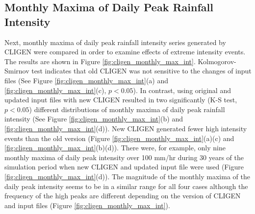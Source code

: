 \subsection{Monthly Maxima of Daily Peak Rainfall Intensity}
Next, monthly maxima of daily peak rainfall intensity series generated by CLIGEN
were compared in order to examine effects of extreme intensity events. The
results are shown in Figure \ref{fig:cligen_monthly_max_int}.
Kolmogorov-Smirnov test indicates that old CLIGEN was not sensitive to the
changes of input files (See Figure \ref{fig:cligen_monthly_max_int}(a) and
\ref{fig:cligen_monthly_max_int}(c), $p<0.05$). In contrast, using original and
updated input files with new CLIGEN resulted in two significantly (K-S test,
$p<0.05$) different distributions of monthly maxima of daily peak rainfall
intensity (See Figure \ref{fig:cligen_monthly_max_int}(b) and
\ref{fig:cligen_monthly_max_int}(d)).
New CLIGEN generated fewer high intensity events than the old version (Figure
\ref{fig:cligen_monthly_max_int}(a)(c) and
\ref{fig:cligen_monthly_max_int}(b)(d)). There were, for example, only nine
monthly maxima of daily peak intensity over 100 mm/hr during 30 years of the
simulation period when new CLIGEN and updated input file were used (Figure
\ref{fig:cligen_monthly_max_int}(d)). The magnitude of the monthly maxima of the
daily peak intensity seems to be in a similar range for all four cases although
the frequency of the high peaks are different depending on the version of
CLIGEN and input files (Figure \ref{fig:cligen_monthly_max_int}).

